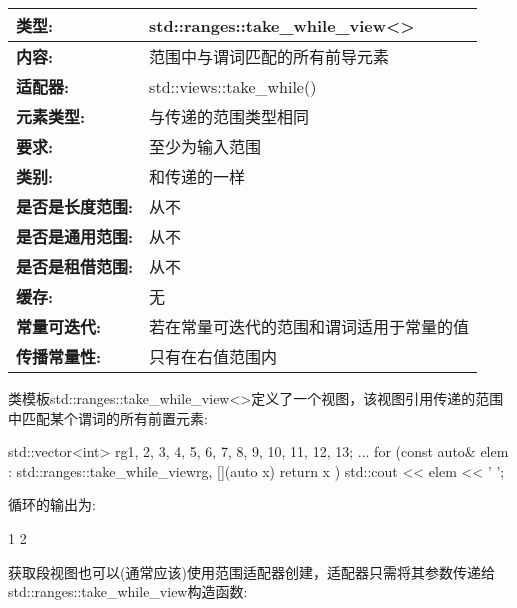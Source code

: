 \begin{longtable}[c]{|l|l|}
\hline
\textbf{类型:}                 & std::ranges::take\_while\_view\textless{}\textgreater{}        \\ \hline
\endfirsthead
%
\endhead
%
\textbf{内容:}              & 范围中与谓词匹配的所有前导元素         \\ \hline
\textbf{适配器:}           & std::views::take\_while() \\ \hline
\textbf{元素类型:}      & 与传递的范围类型相同 \\ \hline
\textbf{要求:}          & 至少为输入范围      \\ \hline
\textbf{类别:}          & 和传递的一样            \\ \hline
\textbf{是否是长度范围:}    & 从不                     \\ \hline
\textbf{是否是通用范围:}   & 从不                     \\ \hline
\textbf{是否是租借范围:} & 从不                     \\ \hline
\textbf{缓存:}            & 无                   \\ \hline
\textbf{常量可迭代:}       & 若在常量可迭代的范围和谓词适用于常量的值 \\ \hline
\textbf{传播常量性:} & 只有在右值范围内                                        \\ \hline
\end{longtable}

类模板std::ranges::take\_while\_view<>定义了一个视图，该视图引用传递的范围中匹配某个谓词的所有前置元素:

\begin{cpp}
std::vector<int> rg{1, 2, 3, 4, 5, 6, 7, 8, 9, 10, 11, 12, 13};
...
for (const auto& elem : std::ranges::take_while_view{rg, [](auto x) {
									return x %
							}}) {
	std::cout << elem << ' ';
}
\end{cpp}

循环的输出为:

\begin{shell}
1 2
\end{shell}


获取段视图也可以(通常应该)使用范围适配器创建，适配器只需将其参数传递给std::ranges::take\_while\_view构造函数:


